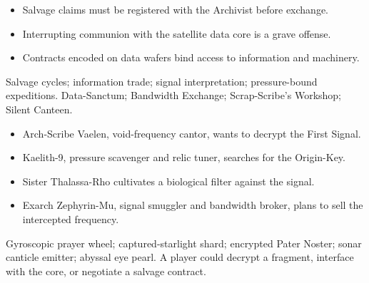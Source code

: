 \documentclass[10pt]{article}
\begin{document}
\begin{minipage}[t]{0.48\linewidth}
\begin{itemize}
\item Salvage claims must be registered with the Archivist before exchange.
\item Interrupting communion with the satellite data core is a grave offense.
\item Contracts encoded on data wafers bind access to information and machinery.
\end{itemize}
Salvage cycles; information trade; signal interpretation; pressure-bound expeditions.
Data-Sanctum; Bandwidth Exchange; Scrap-Scribe's Workshop; Silent Canteen.
\end{minipage}\hfill
\begin{minipage}[t]{0.48\linewidth}
\begin{itemize}
\item Arch-Scribe Vaelen, void-frequency cantor, wants to decrypt the First Signal.
\item Kaelith-9, pressure scavenger and relic tuner, searches for the Origin-Key.
\item Sister Thalassa-Rho cultivates a biological filter against the signal.
\item Exarch Zephyrin-Mu, signal smuggler and bandwidth broker, plans to sell the intercepted frequency.
\end{itemize}
Gyroscopic prayer wheel; captured-starlight shard; encrypted Pater Noster; sonar canticle emitter; abyssal eye pearl. A player could decrypt a fragment, interface with the core, or negotiate a salvage contract.
\end{minipage}
\end{document}
